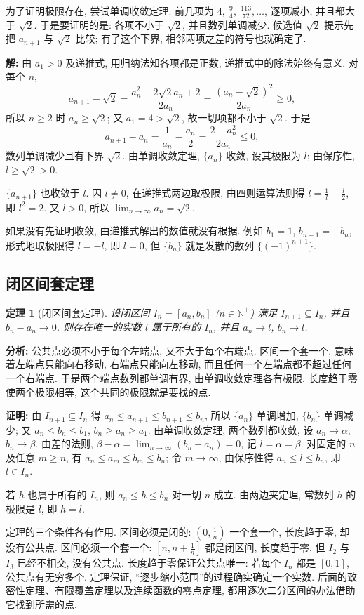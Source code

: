 \documentclass[UTF8,openany]{ctexbook}
\theoremstyle{chinesetextbook}
\newtheorem{theorem}{定理}[section]
\newenvironment{cnproof}{\par\indent\textbf{证明:} \ignorespaces}{\par}
\newenvironment{cnsolution}{\par\indent\textbf{解:} \ignorespaces}{\par}
\begin{document}
为了证明极限存在, 尝试单调收敛定理. 前几项为 $\displaystyle4,\ \frac94,\ \frac{113}{72},\ldots$, 逐项减小, 并且都大于 $\sqrt2$. 于是要证明的是: 各项不小于 $\sqrt2$, 并且数列单调减少. 候选值 $\sqrt2$ 提示先把 $a_{n+1}$ 与 $\sqrt2$ 比较; 有了这个下界, 相邻两项之差的符号也就确定了.
\begin{cnsolution}
由 $a_1>0$ 及递推式, 用归纳法知各项都是正数, 递推式中的除法始终有意义. 对每个 $n$,
\[
a_{n+1}-\sqrt2=\frac{a_n^2-2\sqrt2a_n+2}{2a_n}=\frac{(a_n-\sqrt2)^2}{2a_n}\ge0,
\]
所以 $n\ge2$ 时 $a_n\ge\sqrt2$; 又 $a_1=4>\sqrt2$, 故一切项都不小于 $\sqrt2$. 于是
\[
a_{n+1}-a_n=\frac1{a_n}-\frac{a_n}2=\frac{2-a_n^2}{2a_n}\le0,
\]
数列单调减少且有下界 $\sqrt2$. 由单调收敛定理, $\{a_n\}$ 收敛, 设其极限为 $l$; 由保序性, $l\ge\sqrt2>0$.

$\{a_{n+1}\}$ 也收敛于 $l$. 因 $l\ne0$, 在递推式两边取极限, 由四则运算法则得 $\displaystyle l=\frac1l+\frac l2$, 即 $l^2=2$. 又 $l>0$, 所以 $\displaystyle\lim_{n\to\infty}a_n=\sqrt2$.
\end{cnsolution}
如果没有先证明收敛, 由递推式解出的数值就没有根据. 例如 $b_1=1$, $b_{n+1}=-b_n$, 形式地取极限得 $l=-l$, 即 $l=0$, 但 $\{b_n\}$ 就是发散的数列 $\{(-1)^{n+1}\}$.
\subsection{闭区间套定理}
\begin{theorem}[闭区间套定理]
设闭区间 $I_n=[a_n,b_n]$ ($n\in\mathbb N^+$) 满足 $I_{n+1}\subseteq I_n$, 并且 $b_n-a_n\to0$. 则存在唯一的实数 $l$ 属于所有的 $I_n$, 并且 $a_n\to l$, $b_n\to l$.
\end{theorem}
\par\indent\textbf{分析:} 公共点必须不小于每个左端点, 又不大于每个右端点. 区间一个套一个, 意味着左端点只能向右移动, 右端点只能向左移动, 而且任何一个左端点都不超过任何一个右端点. 于是两个端点数列都单调有界, 由单调收敛定理各有极限. 长度趋于零使两个极限相等, 这个共同的极限就是要找的点.
\begin{cnproof}
由 $I_{n+1}\subseteq I_n$ 得 $a_n\le a_{n+1}\le b_{n+1}\le b_n$, 所以 $\{a_n\}$ 单调增加, $\{b_n\}$ 单调减少; 又 $a_n\le b_n\le b_1$, $b_n\ge a_n\ge a_1$. 由单调收敛定理, 两个数列都收敛, 设 $a_n\to\alpha$, $b_n\to\beta$. 由差的法则, $\displaystyle\beta-\alpha=\lim_{n\to\infty}(b_n-a_n)=0$, 记 $l=\alpha=\beta$. 对固定的 $n$ 及任意 $m\ge n$, 有 $a_n\le a_m\le b_m\le b_n$; 令 $m\to\infty$, 由保序性得 $a_n\le l\le b_n$, 即 $l\in I_n$.

若 $h$ 也属于所有的 $I_n$, 则 $a_n\le h\le b_n$ 对一切 $n$ 成立. 由两边夹定理, 常数列 $h$ 的极限是 $l$, 即 $h=l$.
\end{cnproof}
定理的三个条件各有作用. 区间必须是闭的: $\displaystyle\left(0,\frac1n\right)$ 一个套一个, 长度趋于零, 却没有公共点. 区间必须一个套一个: $\displaystyle\left[n,n+\frac1n\right]$ 都是闭区间, 长度趋于零, 但 $I_2$ 与 $I_3$ 已经不相交, 没有公共点. 长度趋于零保证公共点唯一: 若每个 $I_n$ 都是 $[0,1]$, 公共点有无穷多个. 定理保证, “逐步缩小范围”的过程确实确定一个实数. 后面的致密性定理、有限覆盖定理以及连续函数的零点定理, 都用逐次二分区间的办法借助它找到所需的点.
\end{document}
